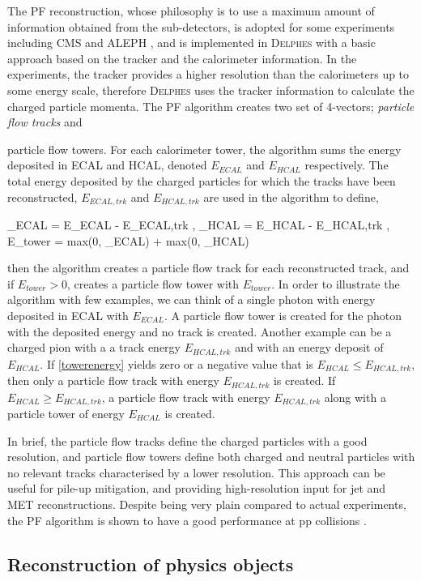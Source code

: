 The PF reconstruction, whose philosophy is to use a maximum amount of information obtained from the sub-detectors, is adopted for some experiments including CMS \cite{CMS-PAS-PFT-09-001} and ALEPH \cite{ALEPH:1994ayc}, and is implemented in \textsc{Delphes} with a basic approach based on the tracker and the calorimeter information. In the experiments, the tracker provides a higher resolution than the calorimeters up to some energy scale, therefore \textsc{Delphes} uses the tracker information to calculate the charged particle momenta. The PF algorithm creates two set of 4-vectors; \emph{particle flow tracks} and {particle flow towers. For each calorimeter tower, the algorithm sums the energy deposited in ECAL and HCAL, denoted $E_{ECAL}$ and $E_{HCAL}$ respectively. The total energy deposited by the charged particles for which the tracks have been reconstructed, $E_{ECAL,trk}$ and $E_{HCAL,trk}$ are used in the algorithm to define,

\be
\Delta_{ECAL} = E_{ECAL} - E_{ECAL,trk} \; , \; \Delta_{HCAL} = E_{HCAL} - E_{HCAL,trk} \; ,
\ee
\be
E_{tower} = max(0, \Delta_{ECAL}) + max(0, \Delta_{HCAL})
\label{towerenergy}
\ee

then the algorithm creates a particle flow track for each reconstructed track, and if $E_{tower} > 0$, creates a particle flow tower with $E_{tower}$. In order to illustrate the algorithm with few examples, we can think of a single photon with energy deposited in ECAL with $E_{ECAL}$. A particle flow tower is created for the photon with the deposited energy and no track is created. Another example can be a charged pion with a a track energy $E_{HCAL,trk}$ and with an energy deposit of $E_{HCAL}$. If \autoref{towerenergy} yields zero or a negative value that is $E_{HCAL}\leq E_{HCAL,trk}$, then only a particle flow track with energy $E_{HCAL,trk}$ is created. If $E_{HCAL}\geq E_{HCAL,trk}$, a particle flow track with energy $E_{HCAL,trk}$ along with a particle tower of energy $E_{HCAL}$ is created.

In brief, the particle flow tracks define the charged particles with a good resolution, and particle flow towers define both charged and neutral particles with no relevant tracks characterised by a lower resolution. This approach can be useful for pile-up mitigation, and providing high-resolution input for jet and MET reconstructions. Despite being very plain compared to actual experiments, the PF algorithm is shown to have a good performance at pp collisions \cite{deFavereau2014}. 

\subsection{Reconstruction of physics objects}

}
